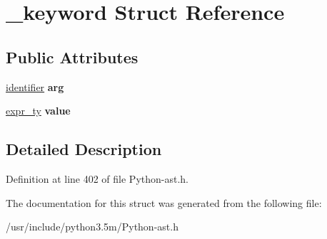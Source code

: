 \hypertarget{struct__keyword}{}\section{\+\_\+keyword Struct Reference}
\label{struct__keyword}
\subsection*{Public Attributes}
\begin{DoxyCompactItemize}
\item 
\hyperlink{struct__object}{identifier} {\bfseries arg}\hypertarget{struct__keyword_a07d59cb850aea7fab117dd6ad60f3b21}{}\label{struct__keyword_a07d59cb850aea7fab117dd6ad60f3b21}

\item 
\hyperlink{struct__expr}{expr\+\_\+ty} {\bfseries value}\hypertarget{struct__keyword_a544c297ad30324f7c021dd1b296e770d}{}\label{struct__keyword_a544c297ad30324f7c021dd1b296e770d}

\end{DoxyCompactItemize}


\subsection{Detailed Description}


Definition at line 402 of file Python-\/ast.\+h.



The documentation for this struct was generated from the following file\+:\begin{DoxyCompactItemize}
\item 
/usr/include/python3.\+5m/Python-\/ast.\+h\end{DoxyCompactItemize}
